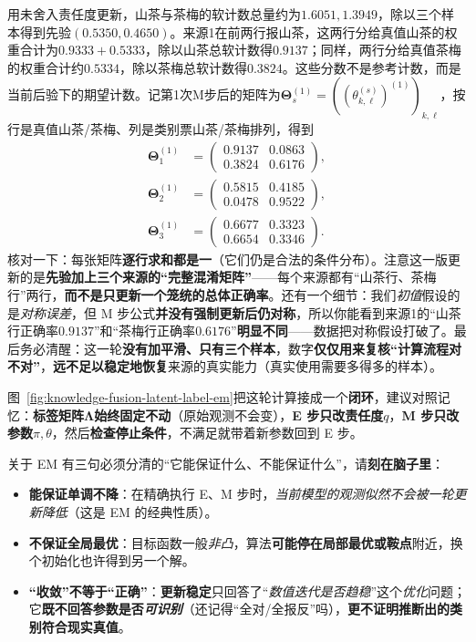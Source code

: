 用未舍入责任度更新，山茶与茶梅的软计数总量约为$1.6051,1.3949$，除以三个样本得到先验$(0.5350,0.4650)$。来源1在前两行报山茶，这两行分给真值山茶的权重合计为$0.9333+0.5333$，除以山茶总软计数得$0.9137$；同样，两行分给真值茶梅的权重合计约$0.5334$，除以茶梅总软计数得$0.3824$。这些分数不是参考计数，而是当前后验下的期望计数。记第1次M步后的矩阵为$\bm{\Theta}_s^{(1)}=\left(\left(\theta^{(s)}_{k,\ell}\right)^{(1)}\right)_{k,\ell}$，按行是真值山茶/茶梅、列是类别票山茶/茶梅排列，得到
\[
  \begin{aligned}
    \bm{\Theta}_1^{(1)}
    &=
    \begin{pmatrix}
      0.9137 & 0.0863 \\
      0.3824 & 0.6176
    \end{pmatrix},\\
    \bm{\Theta}_2^{(1)}
    &=
    \begin{pmatrix}
      0.5815 & 0.4185 \\
      0.0478 & 0.9522
    \end{pmatrix},\\
    \bm{\Theta}_3^{(1)}
    &=
    \begin{pmatrix}
      0.6677 & 0.3323 \\
      0.6654 & 0.3346
    \end{pmatrix}.
  \end{aligned}
\]
核对一下：每张矩阵\textbf{逐行求和都是一}（它们仍是合法的条件分布）。注意这一版更新的是\textbf{先验加上三个来源的“完整混淆矩阵”}——每个来源都有“山茶行、茶梅行”两行，\textbf{而不是只更新一个笼统的总体正确率}。还有一个细节：我们\emph{初值}假设的是\emph{对称误差}，但 M 步公式\textbf{并没有强制更新后仍对称}，所以你能看到来源1的“山茶行正确率$0.9137$”和“茶梅行正确率$0.6176$”\textbf{明显不同}——数据把对称假设打破了。最后务必清醒：这一轮\textbf{没有加平滑、只有三个样本}，数字\textbf{仅仅用来复核“计算流程对不对”}，\textbf{远不足以稳定地恢复}来源的真实能力（真实使用需要多得多的样本）。

图~\ref{fig:knowledge-fusion-latent-label-em}把这轮计算接成一个\textbf{闭环}，建议对照记忆：\textbf{标签矩阵$\bm{\Lambda}$始终固定不动}（原始观测不会变），\textbf{E 步只改责任度}$q$，\textbf{M 步只改参数}$\pi,\theta$，然后\textbf{检查停止条件}，不满足就带着新参数回到 E 步。

关于 EM 有三句必须分清的“它能保证什么、不能保证什么”，请\textbf{刻在脑子里}：
\begin{itemize}\item \textbf{能保证单调不降}：在精确执行 E、M 步时，\emph{当前模型的观测似然不会被一轮更新降低}（这是 EM 的经典性质）。\item \textbf{不保证全局最优}：目标函数一般\emph{非凸}，算法\textbf{可能停在局部最优或鞍点}附近，换个初始化也许得到另一个解。\item \textbf{“收敛”不等于“正确”}：\textbf{更新稳定}只回答了“\emph{数值迭代是否趋稳}”这个\emph{优化}问题；它\textbf{既不回答参数是否\emph{可识别}}（还记得“全对/全报反”吗），\textbf{更不证明推断出的类别符合现实真值}。\end{itemize}

